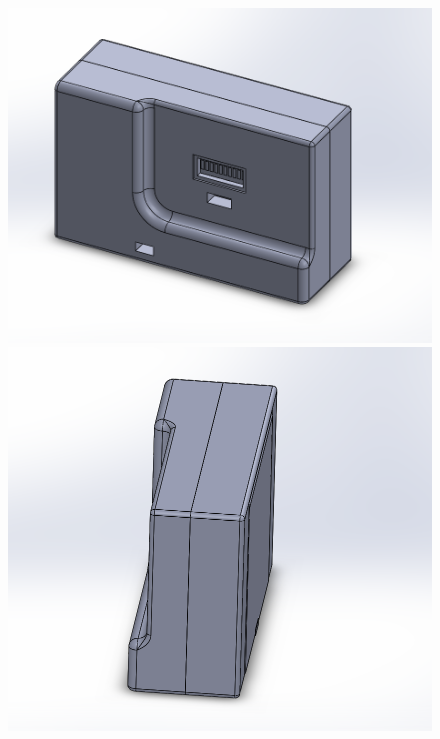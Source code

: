 \documentclass[twocolumn]{article}
\begin{document}
\begin{figure}[h]
\centering
\begin{minipage}[b]{0.2\textwidth}
\includegraphics[width=\textwidth]{1.png}
\end{minipage}
\hfill
\begin{minipage}[b]{0.2\textwidth}
\includegraphics[width=\textwidth]{2.png}
\end{minipage}
\hfill
\begin{minipage}[b]{0.2\textwidth}

\end{minipage}
\end{figure}
\end{document}
